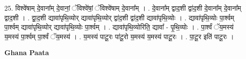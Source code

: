 \documentclass[17pt]{extarticle}
\begin{document}
25. विश्वे॑षाम् दे॒वाना᳚म् दे॒वानां॒ ॅविश्वे॑षां॒ ॅविश्वे॑षाम् दे॒वाना᳚म् । . दे॒वाना᳚म् द्वाद॒शी द्वा॑द॒शी दे॒वाना᳚म् दे॒वाना᳚म् द्वाद॒शी । . द्वा॒द॒शी द्यावा॑पृथि॒व्योर् द्यावा॑पृथि॒व्योर् द्वा॑द॒शी द्वा॑द॒शी द्यावा॑पृथि॒व्योः । . द्यावा॑पृथि॒व्योः पा॒र्श्वम् पा॒र्श्वम् द्यावा॑पृथि॒व्योर् द्यावा॑पृथि॒व्योः पा॒र्श्वम् । . द्यावा॑पृथि॒व्योरिति॒ द्यावा᳚ - पृ॒थि॒व्योः । . पा॒र्श्वं ॅय॒मस्य॑ य॒मस्य॑ पा॒र्श्वम् पा॒र्श्वं ॅय॒मस्य॑ । . य॒मस्य॑ पाटू॒रः पा॑टू॒रो य॒मस्य॑ य॒मस्य॑ पाटू॒रः । . पा॒टू॒र इति॑ पाटू॒रः । \newline

\textbf{Ghana Paata } \newline
\end{document}
